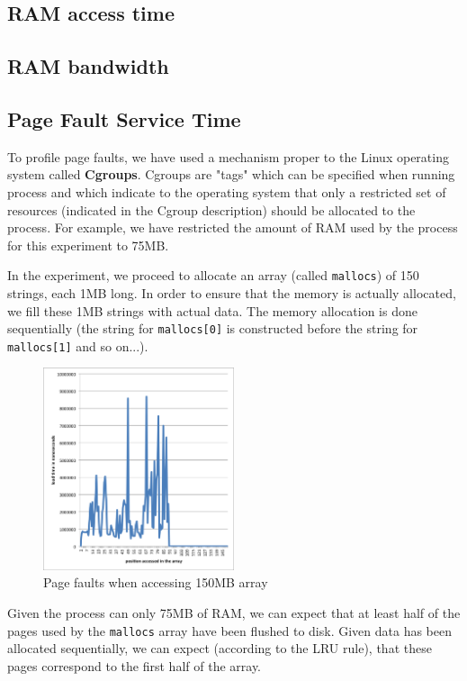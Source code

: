\subsection{RAM access time}

\subsection{RAM bandwidth}



\subsection{Page Fault Service Time}

To profile page faults, we have used a mechanism proper to the Linux operating system called \textbf{Cgroups}. Cgroups are "tags" which can be specified when running process and which indicate to the operating system that only a restricted set of resources (indicated in the Cgroup description) should be allocated to the process. For example, we have restricted the amount of RAM used by the process for this experiment to 75MB.

In the experiment, we proceed to allocate an array (called \texttt{mallocs}) of 150 strings, each 1MB long. In order to ensure that the memory is actually allocated, we fill these 1MB strings with actual data. The memory allocation is done sequentially (the string for \texttt{mallocs[0]} is constructed before the string for \texttt{mallocs[1]} and so on...).

\begin{figure}
 \centering
  \includegraphics[width=0.5\textwidth]{image/pagefault.png}
  \caption{Page faults when accessing 150MB array}
 \label{fig:pagefault}
\end{figure}

Given the process can only 75MB of RAM, we can expect that at least half of the pages used by the \texttt{mallocs} array have been flushed to disk. Given data has been allocated sequentially, we can expect (according to the LRU rule), that these pages correspond to the first half of the array.

